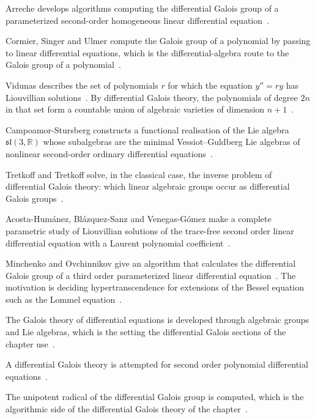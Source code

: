 Arreche develops algorithms computing the differential Galois group of a
parameterized second-order homogeneous linear differential
equation~\cite{WlComputingTheDifferentialGalois2014}.

Cormier, Singer and Ulmer compute the Galois group of a polynomial by passing
to linear differential equations, which is the differential-algebra route to
the Galois group of a polynomial~\cite{WlComputingTheGaloisGroupOfAPoly2000}.

Vidunas describes the set of polynomials $r$ for which the equation $y''=ry$
has Liouvillian solutions~\cite{WlDifferentialEquationsOfOrderTw1999}. By differential Galois theory, the
polynomials of degree $2n$ in that set form a countable union of algebraic
varieties of dimension $n+1$~\cite{WlDifferentialEquationsOfOrderTw1999}.

Campoamor-Stursberg constructs a functional realisation of the Lie algebra
$\mathfrak{sl}(3,\mathbb{R})$ whose subalgebras are the minimal
Vessiot--Guldberg Lie algebras of nonlinear second-order ordinary differential
equations~\cite{WlAFunctionalRealizationOfSl3RPr2016}.

Tretkoff and Tretkoff solve, in the classical case, the inverse problem of
differential Galois theory: which linear algebraic groups occur as
differential Galois groups~\cite{WlSolutionOfTheInverseProblemOfD1979}.

Acosta-Hum\'anez, Bl\'azquez-Sanz and Venegas-G\'omez make a complete
parametric study of Liouvillian solutions of the trace-free second order
linear differential equation with a Laurent polynomial
coefficient~\cite{WlLiouvillianSolutionsForSecondO2020}.

Minchenko and Ovchinnikov give an algorithm that calculates the differential
Galois group of a third order parameterized linear differential equation~\cite{WlCalculatingGaloisGroupsOfThird2018}. The
motivation is deciding hypertranscendence for extensions of the Bessel equation
such as the Lommel equation~\cite{WlCalculatingGaloisGroupsOfThird2018}.

The Galois theory of differential equations is developed through algebraic
groups and Lie algebras, which is the setting the differential Galois sections
of the chapter use~\cite{WlGaloisTheoryOfDifferentialEqua2020}.

A differential Galois theory is attempted for second order polynomial
differential equations~\cite{WlAnAttemptToDifferentialGaloisT2020}.

The unipotent radical of the differential Galois group is computed, which is
the algorithmic side of the differential Galois theory of the
chapter~\cite{WlComputationOfTheUnipotentRadic2020}.

